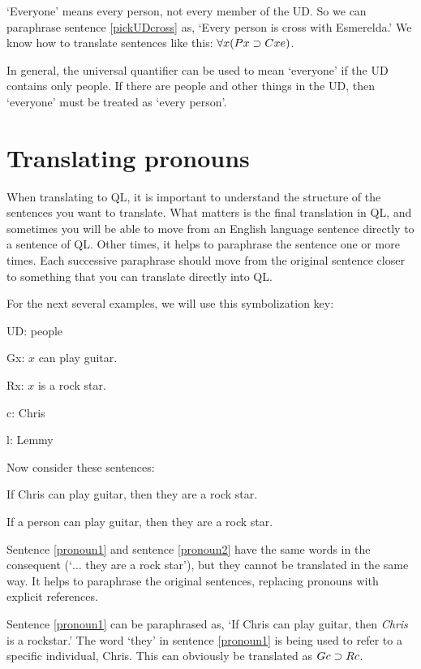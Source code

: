 `Everyone' means every person, not every member of the UD. So we can paraphrase sentence \ref{pickUDcross} as, `Every person is cross with Esmerelda.' We know how to translate sentences like this: $\forall x(Px \supset Cxe)$.

In general, the universal quantifier can be used to mean `everyone' if the UD contains only people. If there are people and other things in the UD, then `everyone' must be treated as `every person'.





\section{Translating pronouns}
When translating to QL, it is important to understand the structure of the sentences you want to translate. What matters is the final translation in QL, and sometimes you will be able to move from an English language sentence directly to a sentence of QL. Other times, it helps to paraphrase the sentence one or more times. Each successive paraphrase should move from the original sentence closer to something that you can translate directly into QL.

For the next several examples, we will use this symbolization key:

\begin{ekey}
\item[UD:] people
\item[Gx:] $x$ can play guitar.
\item[Rx:] $x$ is a rock star.
\item[c:] Chris
\item[l:] Lemmy
\end{ekey}

Now consider these sentences:

\begin{earg}
\item[\ex{pronoun1}] If Chris can play guitar, then they are a rock star.
\item[\ex{pronoun2}] If a person can play guitar, then they are a rock star.
\end{earg}

Sentence \ref{pronoun1} and sentence \ref{pronoun2} have the same words in the consequent (`$\ldots$ they are a rock star'), but they cannot be translated in the same way. It helps to paraphrase the original sentences, replacing pronouns with explicit references.

Sentence \ref{pronoun1} can be paraphrased as, `If Chris can play guitar, then \emph{Chris} is a rockstar.' The word `they' in sentence \ref{pronoun1} is being used to refer to a specific individual, Chris. This can obviously be translated as $Gc \supset Rc$.


